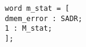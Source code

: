 \documentclass{article}
\begin{document}
\texttt{word m\_stat = [ \\
\hspace*{17mm}dmem\_error : SADR; \\
\hspace*{17mm}1 : M\_stat; \\
\hspace*{5mm}];}
\end{document}
